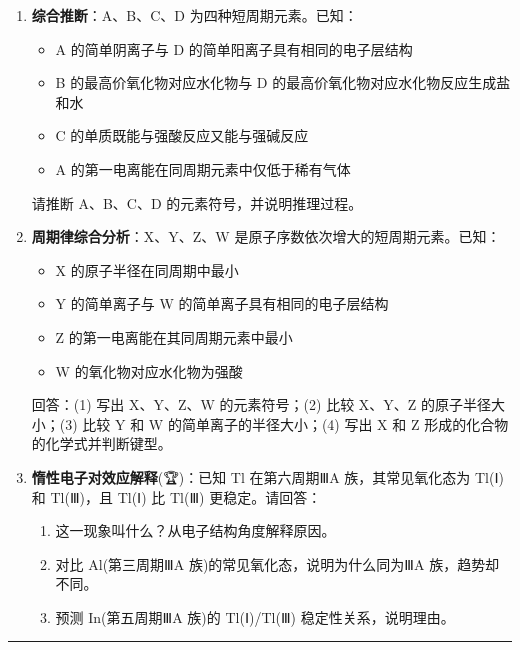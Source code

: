 \begin{enumerate}
\def\labelenumi{\arabic{enumi}.}
\setcounter{enumi}{6}
\item
  \textbf{综合推断}：A、B、C、D 为四种短周期元素。已知：

  \begin{itemize}
  \tightlist
  \item
    A 的简单阴离子与 D 的简单阳离子具有相同的电子层结构
  \item
    B 的最高价氧化物对应水化物与 D 的最高价氧化物对应水化物反应生成盐和水
  \item
    C 的单质既能与强酸反应又能与强碱反应
  \item
    A 的第一电离能在同周期元素中仅低于稀有气体
  \end{itemize}

  请推断 A、B、C、D 的元素符号，并说明推理过程。
\item
  \textbf{周期律综合分析}：X、Y、Z、W 是原子序数依次增大的短周期元素。已知：

  \begin{itemize}
  \tightlist
  \item
    X 的原子半径在同周期中最小
  \item
    Y 的简单离子与 W 的简单离子具有相同的电子层结构
  \item
    Z 的第一电离能在其同周期元素中最小
  \item
    W 的氧化物对应水化物为强酸
  \end{itemize}

  回答：(1) 写出 X、Y、Z、W 的元素符号；(2) 比较 X、Y、Z 的原子半径大小；(3) 比较 Y 和 W 的简单离子的半径大小；(4) 写出 X 和 Z 形成的化合物的化学式并判断键型。
\item
  \textbf{惰性电子对效应解释}(🏆)：已知 Tl 在第六周期ⅢA 族，其常见氧化态为 Tl(Ⅰ) 和 Tl(Ⅲ)，且 Tl(Ⅰ) 比 Tl(Ⅲ) 更稳定。请回答：

  \begin{enumerate}
  \def\labelenumii{(\arabic{enumii})}
  \tightlist
  \item
    这一现象叫什么？从电子结构角度解释原因。
  \item
    对比 Al(第三周期ⅢA 族)的常见氧化态，说明为什么同为ⅢA 族，趋势却不同。
  \item
    预测 In(第五周期ⅢA 族)的 Tl(Ⅰ)/Tl(Ⅲ) 稳定性关系，说明理由。
  \end{enumerate}
\end{enumerate}

\begin{center}\rule{0.5\linewidth}{0.5pt}\end{center}

